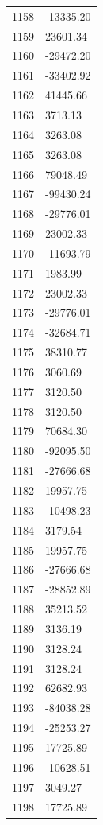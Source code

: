 \documentclass[a4paper,11pt]{article}
\begin{document}
\begin{center}
\begin{longtable}{|R{1.5cm}|R{2.6cm}|}
 1158 &    -13335.20 \\
 1159 &     23601.34 \\
 1160 &    -29472.20 \\
 1161 &    -33402.92 \\
 1162 &     41445.66 \\
 1163 &      3713.13 \\
 1164 &      3263.08 \\
 1165 &      3263.08 \\
 1166 &     79048.49 \\
 1167 &    -99430.24 \\
 1168 &    -29776.01 \\
 1169 &     23002.33 \\
 1170 &    -11693.79 \\
 1171 &      1983.99 \\
 1172 &     23002.33 \\
 1173 &    -29776.01 \\
 1174 &    -32684.71 \\
 1175 &     38310.77 \\
 1176 &      3060.69 \\
 1177 &      3120.50 \\
 1178 &      3120.50 \\
 1179 &     70684.30 \\
 1180 &    -92095.50 \\
 1181 &    -27666.68 \\
 1182 &     19957.75 \\
 1183 &    -10498.23 \\
 1184 &      3179.54 \\
 1185 &     19957.75 \\
 1186 &    -27666.68 \\
 1187 &    -28852.89 \\
 1188 &     35213.52 \\
 1189 &      3136.19 \\
 1190 &      3128.24 \\
 1191 &      3128.24 \\
 1192 &     62682.93 \\
 1193 &    -84038.28 \\
 1194 &    -25253.27 \\
 1195 &     17725.89 \\
 1196 &    -10628.51 \\
 1197 &      3049.27 \\
 1198 &     17725.89 \\

\end{longtable}
\end{center}
\end{document}
